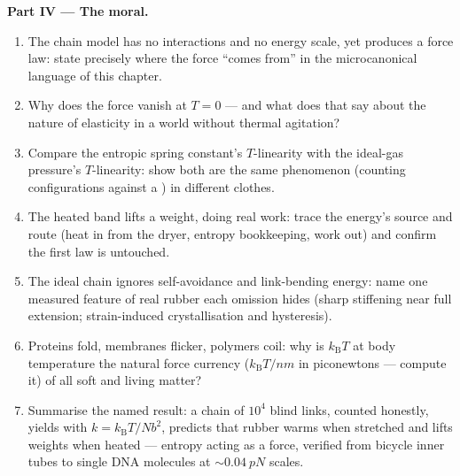 \begin{problem}
\medskip\noindent\textbf{Part IV --- The moral.}
\begin{enumerate}[resume]
  \item The chain model has no interactions and no energy scale,
        yet produces a force law: state precisely where the force
        ``comes from'' in the microcanonical language of this
        chapter.
  \item Why does the force vanish at $T = 0$ --- and what does
        that say about the nature of elasticity in a world without
        thermal agitation?
  \item Compare the entropic spring constant's $T$-linearity with
        the ideal-gas pressure's $T$-linearity: show both are the
        same phenomenon (counting configurations against a
        ) in different clothes.
  \item The heated band lifts a weight, doing real work: trace
        the energy's source and route (heat in from the dryer,
        entropy bookkeeping, work out) and confirm the first law
        is untouched.
  \item The ideal chain ignores self-avoidance and link-bending
        energy: name one measured feature of real rubber each
        omission hides (sharp stiffening near full extension;
        strain-induced crystallisation and hysteresis).
  \item Proteins fold, membranes flicker, polymers coil: why is
        $k_{\text{B}}T$ at body temperature the natural force
        currency ($k_{\text{B}}T/\unit{nm}$ in piconewtons ---
        compute it) of all soft and living matter?
  \item Summarise the named result: a chain of $10^4$ blind links,
        counted honestly, yields  with $k =
        k_{\text{B}}T/Nb^2$, predicts that rubber warms when
        stretched and lifts weights when heated --- entropy acting
        as a force, verified from bicycle inner tubes to single
        DNA molecules at $\sim\qty{0.04}{pN}$ scales.
\end{enumerate}
\end{problem}
